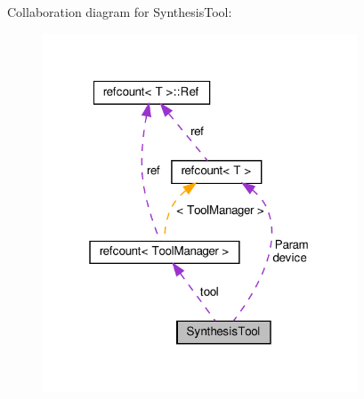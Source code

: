 Collaboration diagram for Synthesis\+Tool\+:
\nopagebreak
\begin{figure}[H]
\begin{center}
\leavevmode
\includegraphics[width=265pt]{dd/db0/classSynthesisTool__coll__graph}
\end{center}
\end{figure}
